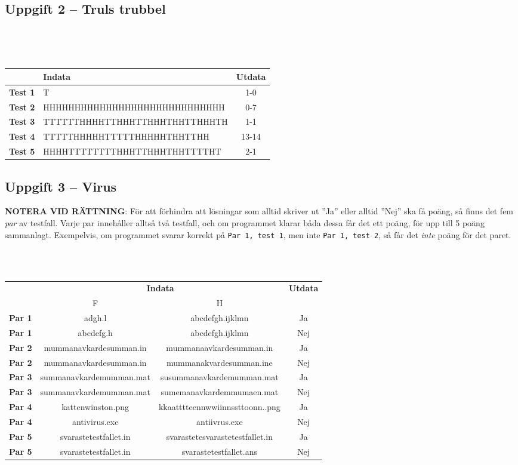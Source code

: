 \documentclass[a4paper,12pt,oneside]{amsbook}
\theoremstyle{test}
\newcommand{\fe}[1]{\textbf{#1}}            %
\begin{document}
\subsection*{Uppgift 2 -- Truls trubbel}
~\\
{\tt 
\begin{tabular}{||l||l||c||}\hline\hline
& {\fe{Indata}} & \fe{Utdata} \\ \hline \hline
\fe{Test 1} & T & 1-0 \\ \hline
\fe{Test 2} & HHHHHHHHHHHHHHHHHHHHHHHHHHHHH & 0-7 \\ \hline
\fe{Test 3} & TTTTTTHHHHTTHHHTTHHHTHHTTHHHTH & 1-1 \\ \hline
\fe{Test 4} & TTTTTHHHHHTTTTTHHHHHTHHTTHH & 13-14\\ \hline
\fe{Test 5} & HHHHTTTTTTTTHHHTTHHHTHHTTTTHT & 2-1\\ \hline\hline
\end{tabular}
}

\newpage

\subsection*{Uppgift 3 -- Virus}
\textbf{NOTERA VID RÄTTNING}: För att förhindra att lösningar som alltid
skriver ut ”Ja” eller alltid ”Nej” ska få poäng, så finns det fem \textit{par} av testfall.
Varje par innehåller alltså två testfall, och om programmet klarar båda dessa
får det ett poäng, för upp till 5 poäng sammanlagt. Exempelvis, om programmet svarar
korrekt på \texttt{Par 1, test 1}, men inte \texttt{Par 1, test 2}, så får det \textit{inte} poäng för det paret.
~\\
{\tt 
\begin{tabular}{||l||c|c||c||}\hline\hline
& \multicolumn{2}{c||}{\fe{Indata}} & \multicolumn{1}{c||}{\fe{Utdata}} \\ 
& F & H &  \\ \hline \hline
\fe{Par 1} & adgh.l & abcdefgh.ijklmn & Ja \\ \hline
\fe{Par 1} & abcdefg.h & abcdefgh.ijklmn & Nej \\ \hline
\fe{Par 2} & mummanavkardesumman.in & mummanaavkardesumman.in & Ja \\ \hline
\fe{Par 2} & mummanavkardesumman.in & mummanakvardesumman.ine & Nej \\ \hline
\fe{Par 3} & summanavkardemumman.mat & susummanavkardemumman.mat & Ja \\ \hline
\fe{Par 3} & summanavkardemumman.mat & sumemanavkardemmumaen.mat & Nej \\ \hline
\fe{Par 4} & kattenwinston.png & kkaatttteennwwiinnssttoonn..png & Ja \\ \hline
\fe{Par 4} & antivirus.exe & antiivrus.exe & Nej \\ \hline
\fe{Par 5} & svarastetestfallet.in & svarastetesvarastetestfallet.in & Ja \\ \hline
\fe{Par 5} & svarastetestfallet.in & svarastetestfallet.ans & Nej \\ \hline\hline
\end{tabular}
}
\vspace{1cm}
\end{document}
